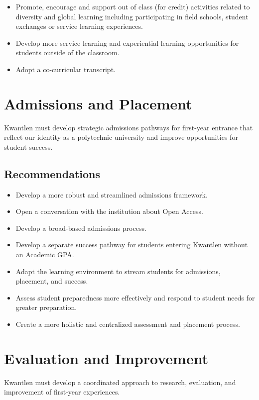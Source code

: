 \documentclass[11pt, letterpaper]{article}
\begin{document}
\begin{itemize}
\item
  Promote, encourage and support out of class (for credit) activities
  related to diversity and global learning including participating in
  field schools, student exchanges or service learning experiences.
\item
  Develop more service learning and experiential learning opportunities
  for students outside of the classroom.
\item
  Adopt a co-curricular transcript.
\end{itemize}

\section{Admissions and Placement}

Kwantlen must develop strategic admissions pathways for first-year
entrance that reflect our identity as a polytechnic university and
improve opportunities for student success.

\subsection{Recommendations}

\begin{itemize}
\item
  Develop a more robust and streamlined admissions framework.
\item
  Open a conversation with the institution about Open Access.
\item
  Develop a broad-based admissions process.
\item
  Develop a separate success pathway for students entering Kwantlen
  without an Academic GPA.
\item
  Adapt the learning environment to stream students for admissions,
  placement, and success.
\item
  Assess student preparedness more effectively and respond to student
  needs for greater preparation.
\item
  Create a more holistic and centralized assessment and placement
  process.
\end{itemize}

\section{Evaluation and Improvement}

Kwantlen must develop a coordinated approach to research, evaluation, and improvement of first-year experiences.
\end{document}
